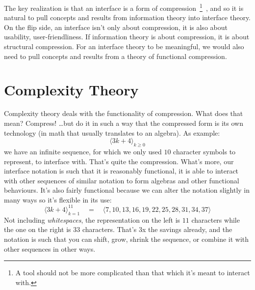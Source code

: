 \documentclass[twoside]{article}
\begin{document}
The key realization is that an interface is a form of compression~\footnote{A tool should not be more complicated than
that which it's meant to interact with.}\ , and so it is natural to pull concepts and results from information theory into
interface theory. On the flip side, an interface isn't only about compression, it is also about usability,
user-friendliness. If information theory is about compression, it is about structural compression. For an interface
theory to be meaningful, we would also need to pull concepts and results from a theory of functional compression.

\section*{Complexity Theory} %

Complexity theory deals with the functionality of compression. What does that mean? Compress! \ldots but do it in
such a way that the compressed form is its own technology (in math that usually translates to an algebra). As example:
$$ \langle3k+4\rangle_{k\ge 0} $$
we have an infinite sequence, for which we only used $ 10 $ character symbols to represent, to interface with. That's quite
the compression.  What's more, our interface notation is such that it is reasonably functional, it is able to interact with
other sequences of similar notation to form algebras and other functional behaviours. It's also fairly functional because
we can alter the notation slightly in many ways so it's flexible in its use:
$$ \langle3k+4\rangle_{k=1}^{11}\quad=\quad\langle7, 10, 13, 16, 19, 22, 25, 28, 31, 34, 37\rangle $$
Not including \emph{whitespaces}, the representation on the left is $ 11 $ characters while the one on the right is $ 33 $
characters. That's $ 3 $x the savings already, and the notation is such that you can shift, grow, shrink the sequence,
or combine it with other sequences in other ways.
\end{document}
